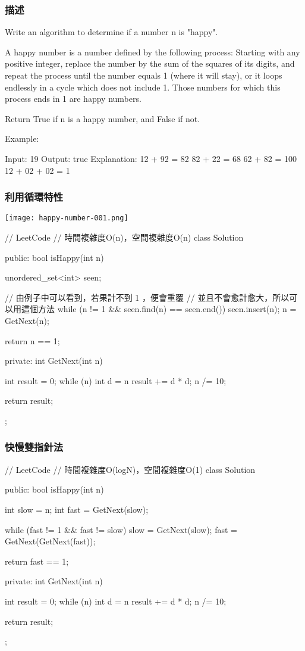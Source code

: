\subsubsection{描述}
Write an algorithm to determine if a number n is "happy".

A happy number is a number defined by the following process: Starting with any positive integer, replace the number by the sum of the squares of its digits, and repeat the process until the number equals 1 (where it will stay), or it loops endlessly in a cycle which does not include 1. Those numbers for which this process ends in 1 are happy numbers.

Return True if n is a happy number, and False if not.

Example:
\begin{Code}
Input: 19
Output: true
Explanation: 
12 + 92 = 82
82 + 22 = 68
62 + 82 = 100
12 + 02 + 02 = 1
\end{Code}

\subsubsection{利用循環特性}
\begin{center}
\texttt{[image: happy-number-001.png]}\\
\label{fig:happy-number-001}
\end{center}

\begin{Code}
// LeetCode
// 時間複雜度O(n)，空間複雜度O(n)
class Solution {
public:
    bool isHappy(int n) {
        unordered_set<int> seen;

        // 由例子中可以看到，若果計不到 1 ，便會重覆
        // 並且不會愈計愈大，所以可以用這個方法
        while (n != 1 && seen.find(n) == seen.end())
        {
            seen.insert(n);
            n = GetNext(n);
        }

        return n == 1;
    }
private:
    int GetNext(int n)
    {
        int result = 0;
        while (n)
        {
            int d = n %
            result += d * d;
            n /= 10;
        }

        return result;
    }
};
\end{Code}

\subsubsection{快慢雙指針法}
\begin{Code}
// LeetCode
// 時間複雜度O(logN)，空間複雜度O(1)
class Solution {
public:
    bool isHappy(int n) {
        int slow = n;
        int fast = GetNext(slow);

        while (fast != 1 && fast != slow)
        {
            slow = GetNext(slow);
            fast = GetNext(GetNext(fast));
        }

        return fast == 1;
    }
private:
    int GetNext(int n)
    {
        int result = 0;
        while (n)
        {
            int d = n %
            result += d * d;
            n /= 10;
        }

        return result;
    }
};
\end{Code}

